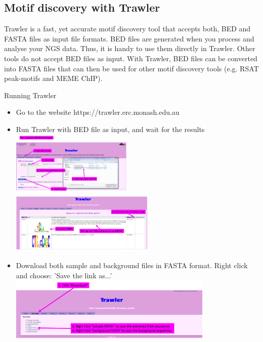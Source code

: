 \subsection{Motif discovery with Trawler}
Trawler is a fast, yet accurate motif discovery tool that accepts both, BED and FASTA files as input file formats. BED files are generated when you process and analyse your NGS data. Thus, it is handy to use them directly in Trawler. Other tools do not accept BED files as input. With Trawler, BED files can be converted into FASTA files that can then be used for other motif discovery tools (e.g. RSAT peak-motifs and MEME ChIP).
%
\begin{steps}
Running Trawler
\begin{itemize}
	\item Go to the website https://trawler.erc.monash.edu.au 
	\item Run Trawler with BED file as input, and wait for the results
		\includegraphics[height=3cm]{Trawler1.PNG}
		\includegraphics[height=3cm]{Trawler2.PNG}
	\item	Download both sample and background files in FASTA format. Right click and choose: 'Save the link as...'
		\includegraphics[height=3cm]{Trawler3.PNG}
\end{itemize}
\end{steps}


